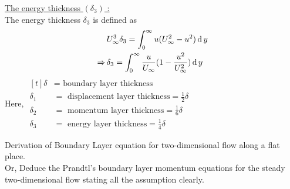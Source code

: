\documentclass[../main-sheet.tex]{subfiles}
\begin{document}
\begin{soln}
    \underline{The energy thickness \((\delta_3)\) :}\\
    The energy thickness \(\delta_3\) is defined as
    \begin{align*}
        &U_\infty^3 \delta_3 =\int_{0}^{\infty}u(U_\infty^2-u^2 )\,\mathrm{d}\, y\\
        \Rightarrow\,&\delta_3 =\int_{0}^{\infty}\frac{u}{U_\infty}(1-\frac{u^2}{U_\infty^2})\,\mathrm{d}\, y
    \end{align*}
    Here, \(\begin{aligned}[t]
        \delta&=\text{ boundary layer thickness}\\
        \delta_1&=\text{ displacement layer thickness}=\frac{1}{2}\delta\\
        \delta_2&=\text{ momentum layer thickness}=\frac{1}{6}\delta\\
        \delta_3&=\text{ energy layer thickness}=\frac{1}{4}\delta
    \end{aligned}\)
\end{soln}
\begin{prob}
    Derivation of Boundary Layer equation for two-dimensional flow along a flat place.\\
    Or, Deduce the Prandtl's boundary layer momentum equations for the steady two-dimensional flow stating all the assumption clearly.
\end{prob}
\end{document}
